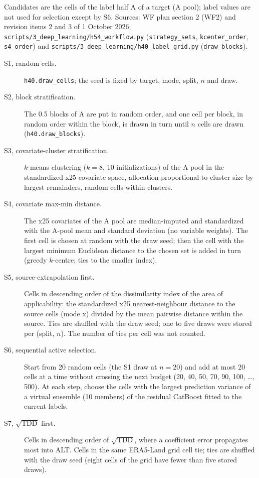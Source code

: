 Candidates are the cells of the label half A of a target (A pool); label values are not used for selection except by S6. Sources: WF plan section 2 (WF2) and revision items 2 and 3 of 1 October 2026; \texttt{scripts/3\_deep\_learning/h54\_workflow.py} (\texttt{strategy\_sets}, \texttt{kcenter\_order}, \texttt{s4\_order}) and \texttt{scripts/3\_deep\_learning/h40\_label\_grid.py} (\texttt{draw\_blocks}).
\begin{description}
\item[S1, random cells.] \texttt{h40.draw\_cells}; the seed is fixed by target, mode, split, $n$ and draw.
\item[S2, block stratification.] The 0.5\textdegree{} blocks of A are put in random order, and one cell per block, in random order within the block, is drawn in turn until $n$ cells are drawn (\texttt{h40.draw\_blocks}).
\item[S3, covariate-cluster stratification.] $k$-means clustering ($k = 8$, 10 initializations) of the A pool in the standardized x25 covariate space, allocation proportional to cluster size by largest remainders, random cells within clusters.
\item[S4, covariate max-min distance.] The x25 covariates of the A pool are median-imputed and standardized with the A-pool mean and standard deviation (no variable weights). The first cell is chosen at random with the draw seed; then the cell with the largest minimum Euclidean distance to the chosen set is added in turn (greedy $k$-centre; ties to the smaller index).
\item[S5, source-extrapolation first.] Cells in descending order of the dissimilarity index of the area of applicability: the standardized x25 nearest-neighbour distance to the source cells (mode x) divided by the mean pairwise distance within the source. Ties are shuffled with the draw seed; one to five draws were stored per (split, $n$). The number of ties per cell was not counted.
\item[S6, sequential active selection.] Start from 20 random cells (the S1 draw at $n = 20$) and add at most 20 cells at a time without crossing the next budget (20, 40, 50, 70, 90, 100, \dots, 500). At each step, choose the cells with the largest prediction variance of a virtual ensemble (10 members) of the residual CatBoost fitted to the current labels.
\item[S7, $\sqrt{\mathrm{TDD}}$ first.] Cells in descending order of $\sqrt{\mathrm{TDD}}$, where a coefficient error propagates most into ALT. Cells in the same ERA5-Land grid cell tie; ties are shuffled with the draw seed (eight cells of the grid have fewer than five stored draws).
\end{description}
